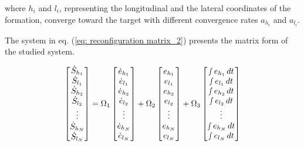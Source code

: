 \noindent where $h_i$ and $l_i$, representing the longitudinal and the lateral coordinates of the formation, converge toward the target with different convergence rates $a_{h_i}$ and $a_{l_i}$. 


The system in eq. (\ref{eq: reconfiguration matrix_2}) presents the matrix form of the studied system.


\begin{equation}\label{eq: reconfiguration matrix_2}
\begin{bmatrix} 
\dot{S}_{h_{1}} \\
\dot{S}_{l_{1}} \\
\dot{S}_{h_{2}} \\
\dot{S}_{l_{2}} \\
\vdots \\
\dot{S}_{h_{N}} \\
\dot{S}_{l_{N}} \\
\end{bmatrix}= 
 \Omega_{1}
  \begin{bmatrix} 
\dot{e}_{h_{1}} \\
\dot{e}_{l_{1}} \\
\dot{e}_{h_{2}} \\
\dot{e}_{l_{2}} \\
\vdots \\
\dot{e}_{h_{N}} \\
\dot{e}_{l_{N}} \\
\end{bmatrix}+
\Omega_{2}
  \begin{bmatrix} 
 {e}_{h_{1}} \\
{e}_{l_{1}} \\
{e}_{h_{2}} \\
{e}_{l_{2}} \\
\vdots \\
{e}_{h_{N}} \\
{e}_{l_{N}} \\
\end{bmatrix}
+\Omega_{3}
  \begin{bmatrix} 
 \smallint{e}_{h_{1}} \, dt\\
\smallint{e}_{l_{1}} \,dt\\
\smallint{e}_{h_{2}} \, dt\\
\smallint{e}_{l_{2}} \, dt\\
\vdots \\
\smallint{e}_{h_{N}} \, dt\\
\smallint{e}_{l_{N}} \, dt \\
\end{bmatrix}
\end{equation}


